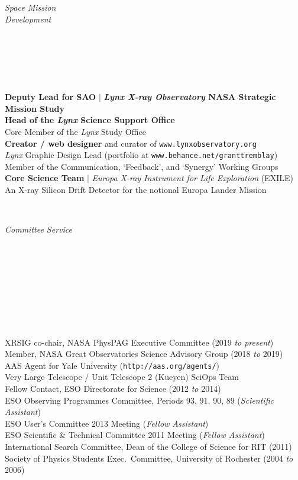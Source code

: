 \documentclass[11pt]{article}
\begin{document}
\hspace{2.5mm} \parbox{1.5in}{\textit{Space Mission \\ Development\\\\\\\\\\\\} } \parbox{5.15in}{
\textbf{Deputy Lead for SAO} $|$ \textbf{\textit{Lynx X-ray Observatory} NASA Strategic Mission Study} \\
\textbf{Head of the \textit{Lynx} Science Support Office} \\
Core Member of the \textit{Lynx} Study Office\\
\textbf{Creator / web designer} and curator of \small \texttt{www.lynxobservatory.org} \\
\textit{Lynx} Graphic Design Lead (portfolio at {\small \texttt{www.behance.net/granttremblay}})\\
Member of the Communication, `Feedback', and `Synergy' Working Groups\\


\textbf{Core Science Team} $|$ \textit{Europa X-ray Instrument for Life Exploration} (EXILE)\\
An X-ray Silicon Drift Detector for the notional Europa Lander Mission} \\


\vspace{4mm}


\hspace{2.5mm} \parbox{1.5in}{\textit{Committee Service\\\\\\\\\\\\\\\\\\}} \parbox{5.15in}{
XRSIG co-chair, NASA PhysPAG Executive Committee (2019 \textit{to present})\\
Member, NASA Great Observatories Science Advisory Group (2018 \textit{to} 2019)\\
AAS Agent for Yale University ({\small \texttt{http://aas.org/agents/}})\\
Very Large Telescope / Unit Telescope 2 (Kueyen) SciOps Team \\
Fellow Contact, ESO Directorate for Science (2012 \textit{to} 2014) \\
ESO Observing Programmes Committee, Periods 93, 91, 90, 89 (\textit{Scientific Assistant})\\
ESO User's Committee 2013 Meeting (\textit{Fellow Assistant})\\
ESO Scientific \& Technical Committee 2011 Meeting (\textit{Fellow Assistant})\\
International Search Committee, Dean of the College of Science for RIT (2011) \\
Society of Physics Students Exec.~Committee, University of Rochester (2004 \textit{to} 2006)}\\
\end{document}
